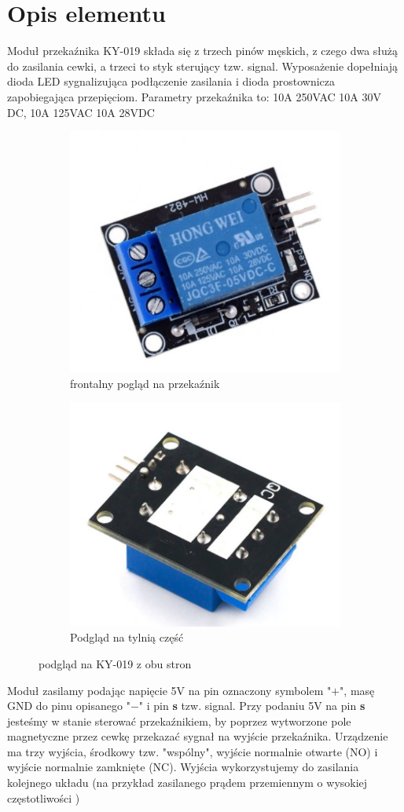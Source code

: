 \documentclass[11pt, a4paper]{article}
\institute{Instytut Robotyki i Inteligencji Maszynowej}
\begin{document}
\newpage

\section*{Opis elementu} 
Moduł przekaźnika KY-019 składa się z trzech pinów męskich, z czego dwa służą do zasilania cewki, a  trzeci to styk sterujący tzw. signal.
Wyposażenie dopełniają dioda LED sygnalizująca podłączenie zasilania i dioda prostownicza zapobiegająca przepięciom.
Parametry przekaźnika to: 10A 250VAC 10A 30V DC, 10A 125VAC 10A 28VDC


\vspace{0.5cm}
\begin{figure}[h]
\centering
\begin{subfigure}{.5\textwidth}
  \centering
  \includegraphics[width=.4\linewidth]{fig/obrazki/zdj_modułu/przod.jpg}
  \caption{frontalny pogląd na przekaźnik}
  \label{fig:sub1}
\end{subfigure}%
\begin{subfigure}{.5\textwidth}
  \centering
  \includegraphics[width=.4\linewidth]{fig/obrazki/zdj_modułu/tył_.jpg}
  \caption{Podgląd na tylnią część}
  \label{fig:sub2}
\end{subfigure}
\caption{podgląd na KY-019 z obu stron}
\label{fig:test}
\end{figure}
\vspace{0.5cm}

Moduł zasilamy podając napięcie 5V na pin oznaczony symbolem "$+$", masę GND do pinu opisanego "$-$" i pin \textbf{s} tzw. signal. Przy podaniu 5V na pin \textbf{s} jesteśmy w stanie sterować przekaźnikiem, by poprzez wytworzone pole magnetyczne przez cewkę przekazać sygnał na wyjście przekaźnika. Urządzenie ma trzy wyjścia, środkowy tzw. "wspólny", wyjście normalnie otwarte (NO) i wyjście normalnie zamknięte (NC). Wyjścia wykorzystujemy do zasilania kolejnego układu (na przykład zasilanego prądem przemiennym o wysokiej częstotliwości )
\end{document}
